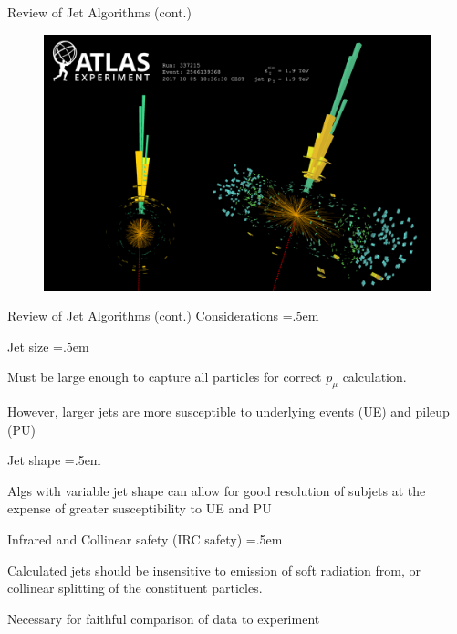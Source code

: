 \documentclass[xcolor={dvipsnames}]{beamer}
\let\olditemize=\itemize
\let\endolditemize=\enditemize
\renewenvironment{itemize}{\olditemize \itemsep=.5em }{\endolditemize}
\begin{document}
\begin{frame}{Review of Jet Algorithms (cont.)}
\begin{figure}
    \centering
    \includegraphics[scale=0.27]{jet_example.png}
\end{figure}
\end{frame}

\begin{frame}{Review of Jet Algorithms (cont.)}
\alert{Considerations}
\begin{itemize}
    \item<2-> Jet size
    \begin{itemize}
        \item<3-> Must be large enough to capture all particles for correct $p_\mu$ calculation.
        \item<4-> However, larger jets are more susceptible to underlying events (UE) and pileup (PU)
    \end{itemize}
    \item<5-> Jet shape
    \begin{itemize}
        \item<6-> Algs with variable jet shape can allow for good resolution of subjets at the expense of greater susceptibility to UE and PU
    \end{itemize}
    \item<7-> Infrared and Collinear safety (IRC safety)
    \begin{itemize}
        \item<8-> Calculated jets should be insensitive to emission of soft radiation from, or collinear splitting of the constituent particles.
        \item<9-> Necessary for faithful comparison of data to experiment
    \end{itemize}
\end{itemize}
\end{frame}
\end{document}
